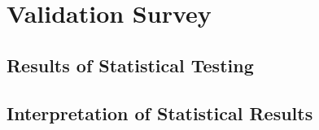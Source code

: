\section{Validation Survey}



\subsection{Results of Statistical Testing}

\subsection{Interpretation of Statistical Results}
